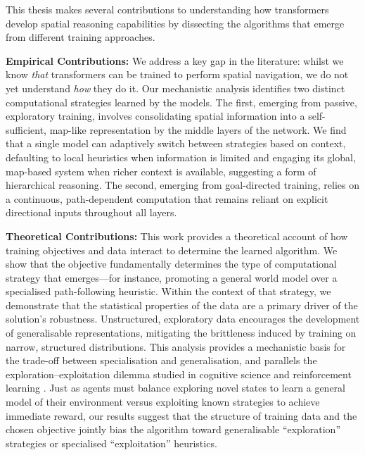 This thesis makes several contributions to understanding how transformers develop spatial reasoning capabilities by dissecting the algorithms that emerge from different training approaches.

\textbf{Empirical Contributions:} We address a key gap in the literature: whilst we know \textit{that} transformers can be trained to perform spatial navigation, we do not yet understand \textit{how} they do it. Our mechanistic analysis identifies two distinct computational strategies learned by the models. The first, emerging from passive, exploratory training, involves consolidating spatial information into a self-sufficient, map-like representation by the middle layers of the network. We find that a single model can adaptively switch between strategies based on context, defaulting to local heuristics when information is limited and engaging its global, map-based system when richer context is available, suggesting a form of hierarchical reasoning. The second, emerging from goal-directed training, relies on a continuous, path-dependent computation that remains reliant on explicit directional inputs throughout all layers. 

\textbf{Theoretical Contributions:} This work provides a theoretical account of how training objectives and data interact to determine the learned algorithm. We show that the objective fundamentally determines the type of computational strategy that emerges—for instance, promoting a general world model over a specialised path-following heuristic. Within the context of that strategy, we demonstrate that the statistical properties of the data are a primary driver of the solution's robustness. Unstructured, exploratory data encourages the development of generalisable representations, mitigating the brittleness induced by training on narrow, structured distributions. This analysis provides a mechanistic basis for the trade-off between specialisation and generalisation, and parallels the exploration–exploitation dilemma studied in cognitive science and reinforcement learning \citep{explorationexploitation}. Just as agents must balance exploring novel states to learn a general model of their environment versus exploiting known strategies to achieve immediate reward, our results suggest that the structure of training data and the chosen objective jointly bias the algorithm toward generalisable “exploration” strategies or specialised “exploitation” heuristics. 


